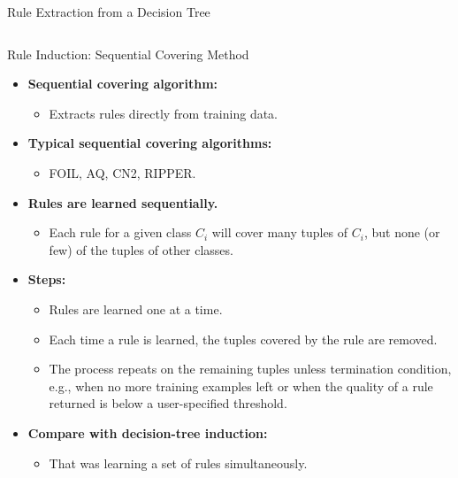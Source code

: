 \begin{frame}{Rule Extraction from a Decision Tree}
\begin{columns}
\begin{column}{0.55\textwidth}
		\end{column}
	\end{columns}
\end{frame}

\begin{frame}{Rule Induction: Sequential Covering Method}
	\begin{itemize}
		\item \textbf{Sequential covering algorithm:}
		      \begin{itemize}
			      \item Extracts rules directly from training data.
		      \end{itemize}
		\item \textbf{Typical sequential covering algorithms:}
		      \begin{itemize}
			      \item FOIL, AQ, CN2, RIPPER.
		      \end{itemize}
		\item \textbf{Rules are learned {\color{airforceblue}sequentially}.}
		      \begin{itemize}
			      \item Each rule for a given class $C_i$ will cover many tuples of $C_i$, but none (or few) of the tuples of other classes.
		      \end{itemize}
		\item \textbf{Steps:}
		      \begin{itemize}
			      \item Rules are learned one at a time.
			      \item Each time a rule is learned, the tuples covered by the rule are removed.
			      \item The process repeats on the remaining tuples unless termination condition, e.g., when no more training examples left or when the quality of a rule returned is below a user-specified threshold.
		      \end{itemize}
		\item \textbf{Compare with decision-tree induction:}
		      \begin{itemize}
			      \item That was learning a set of rules simultaneously.
		      \end{itemize}
	\end{itemize}
\end{frame}

